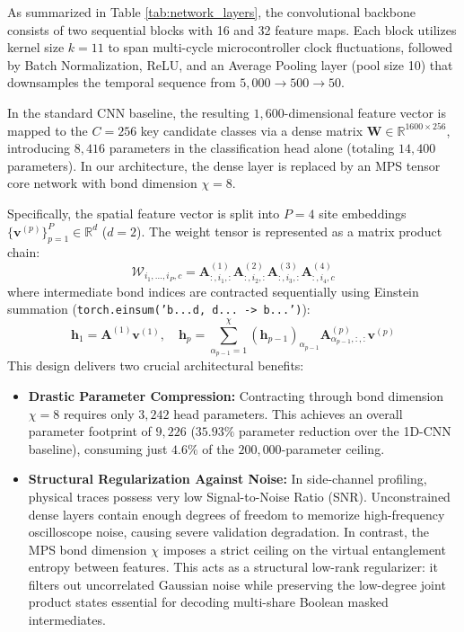 \documentclass[letterpaper]{article}
\begin{document}
As summarized in Table \ref{tab:network_layers}, the convolutional backbone consists of two sequential blocks with 16 and 32 feature maps. Each block utilizes kernel size $k = 11$ to span multi-cycle microcontroller clock fluctuations, followed by Batch Normalization, ReLU, and an Average Pooling layer (pool size 10) that downsamples the temporal sequence from $5,000 \to 500 \to 50$.

In the standard CNN baseline, the resulting $1,600$-dimensional feature vector is mapped to the $C = 256$ key candidate classes via a dense matrix $\mathbf{W} \in \mathbb{R}^{1600 \times 256}$, introducing $8,416$ parameters in the classification head alone (totaling $14,400$ parameters). In our architecture, the dense layer is replaced by an MPS tensor core network with bond dimension $\chi = 8$. 

Specifically, the spatial feature vector is split into $P = 4$ site embeddings $\{\mathbf{v}^{(p)}\}_{p=1}^P \in \mathbb{R}^d$ ($d=2$). The weight tensor is represented as a matrix product chain:
\begin{equation}
\mathcal{W}_{i_1, \dots, i_P, c} = \mathbf{A}^{(1)}_{:, i_1, :} \mathbf{A}^{(2)}_{:, i_2, :} \mathbf{A}^{(3)}_{:, i_3, :} \mathbf{A}^{(4)}_{:, i_4, c}
\label{eq:mps_chain}
\end{equation}
where intermediate bond indices are contracted sequentially using Einstein summation (\texttt{torch.einsum('b...d, d... -> b...')}):
\begin{equation}
\mathbf{h}_1 = \mathbf{A}^{(1)} \mathbf{v}^{(1)}, \quad \mathbf{h}_p = \sum_{\alpha_{p-1}=1}^{\chi} (\mathbf{h}_{p-1})_{\alpha_{p-1}} \mathbf{A}^{(p)}_{\alpha_{p-1}, :, :} \mathbf{v}^{(p)}
\label{eq:einsum_step}
\end{equation}
This design delivers two crucial architectural benefits:
\begin{itemize}
    \item \textbf{Drastic Parameter Compression:} Contracting through bond dimension $\chi = 8$ requires only $3,242$ head parameters. This achieves an overall parameter footprint of $9,226$ ($35.93\%$ parameter reduction over the 1D-CNN baseline), consuming just $4.6\%$ of the $200,000$-parameter ceiling.
    \item \textbf{Structural Regularization Against Noise:} In side-channel profiling, physical traces possess very low Signal-to-Noise Ratio (SNR). Unconstrained dense layers contain enough degrees of freedom to memorize high-frequency oscilloscope noise, causing severe validation degradation. In contrast, the MPS bond dimension $\chi$ imposes a strict ceiling on the virtual entanglement entropy between features. This acts as a structural low-rank regularizer: it filters out uncorrelated Gaussian noise while preserving the low-degree joint product states essential for decoding multi-share Boolean masked intermediates.
\end{itemize}
\end{document}
